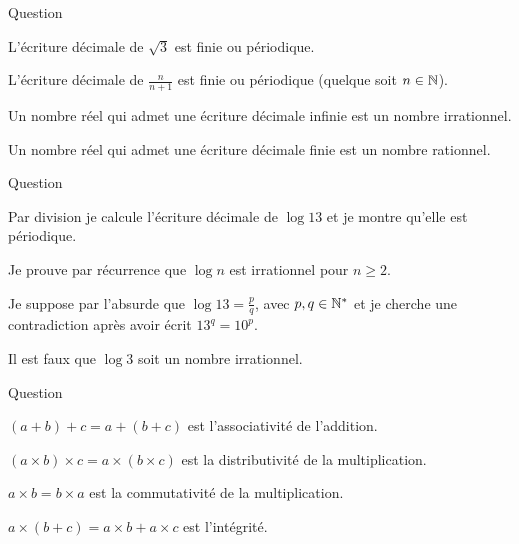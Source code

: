 \begin{multi}[multiple,feedback=
{Les nombre rationnels sont exactement les nombres qui admettent une écriture décimale finie ou périodique.
}]{Question}
    \item L'écriture décimale de \(\sqrt{3}\) est finie ou périodique.
    \item* L'écriture décimale de \(\frac{n}{n+1}\) est finie ou périodique (quelque soit \(n\in\mathbb{N}\)).
    \item Un nombre réel qui admet une écriture décimale infinie est un nombre irrationnel.
    \item* Un nombre réel qui admet une écriture décimale finie est un nombre rationnel.
\end{multi}


\begin{multi}[multiple,feedback=
{On raisonne par l'absurde en écrivant \(\log 13 = \frac pq\), où \(p,q\) sont des entiers strictement positifs. On en déduit que \(13^q = 10^p\). Comme \(13\) et \(10\) sont premiers entre eux, alors on obtient \(p=q=0\) et donc une contradiction.
}]{Question}
    \item Par division je calcule l'écriture décimale de \(\log 13\) et je montre qu'elle est périodique.
    \item Je prouve par récurrence que \(\log n\) est irrationnel pour \(n\ge2\).
    \item* Je suppose par l'absurde que \(\log 13 = \frac pq\), avec \(p,q \in \mathbb{N}^*\) et je cherche une contradiction après avoir écrit \(13^q = 10^p\).
    \item Il est faux que \(\log 3\) soit un nombre irrationnel.
\end{multi}


\begin{multi}[multiple,feedback=
{\((a+b)+c=a+(b+c)\) est l'associativité de l'addition.
\((a \times b)\times c=a \times (b \times c)\) est l'associativité de la multiplication.
\(a \times b = b\times a\) est la commutativité de la multiplication.
\(a \times (b+c) = a\times b + a \times c\) est la distributivité de la multiplication  par rapport à l'addition.
}]{Question}
    \item* \((a+b)+c=a+(b+c)\) est l'associativité de l'addition.
    \item \((a \times b) \times c=a \times (b \times c)\) est la distributivité de la multiplication.
    \item* \(a \times b = b\times a\) est la commutativité de la multiplication.
    \item \(a \times (b+c) = a\times b + a \times c\) est l'intégrité.
\end{multi}


